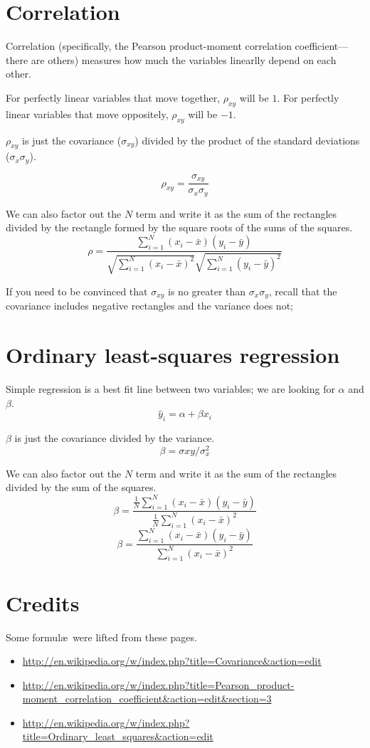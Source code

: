 \documentclass{article}
\begin{document}
\section{Correlation}
Correlation (specifically, the Pearson product-moment correlation coefficient---there are others)
measures how much the variables linearlly depend on each other.

For perfectly linear variables that move together, $\rho_{xy}$ will be $1$.
For perfectly linear variables that move oppositely, $\rho_{xy}$ will be $-1$.

$\rho_{xy}$ is just the covariance ($\sigma_{xy}$) divided by
the product of the standard deviations ($\sigma_x\sigma_y$).

$$ \rho_{xy} = \frac{\sigma_{xy}}{\sigma_x\sigma_y} $$

We can also factor out the $N$ term and write it as the sum of the rectangles divided by
the rectangle formed by the square roots of the sums of the squares.
$$ \rho = \frac
{ \sum_{i=1}^{N}\left( x_{i}-\bar{x} \right) \left( y_{i}-\bar{y} \right) }
{
  \sqrt{\sum_{i=1}^{N}\left( x_{i}-\bar{x} \right)^2}
  \sqrt{\sum_{i=1}^{N}\left( y_{i}-\bar{y} \right)^2}
}
$$

If you need to be convinced that $\sigma_{xy}$ is no greater than $\sigma_x\sigma_y$,
recall that the covariance includes negative rectangles and the variance does not;



\section{Ordinary least-squares regression}
Simple regression is a best fit line between two variables; we are looking for $\alpha$ and $\beta$.
$$ \hat{y}_i = \alpha + \beta x_i$$

$\beta$ is just the covariance divided by the variance.
$$ \beta = \sigma{xy}/\sigma_x^2 $$

We can also factor out the $N$ term and write it as the sum of the rectangles divided by the sum of the squares.
$$ \beta = \frac
{\frac{1}{N}\sum_{i=1}^{N}\left( x_{i}-\bar{x} \right) \left( y_{i}-\bar{y} \right)}
{\frac{1}{N}\sum_{i=1}^{N}\left( x_{i}-\bar{x} \right)^2}
$$
$$ \beta = \frac
{\sum_{i=1}^{N}\left( x_{i}-\bar{x} \right) \left( y_{i}-\bar{y} \right)}
{\sum_{i=1}^{N}\left( x_{i}-\bar{x} \right)^2}
$$

\section{Credits}
Some formul\ae\ were lifted from these pages.
\begin{itemize}
\item \url{http://en.wikipedia.org/w/index.php?title=Covariance&action=edit}
\item \url{http://en.wikipedia.org/w/index.php?title=Pearson_product-moment_correlation_coefficient&action=edit&section=3}
\item \url{http://en.wikipedia.org/w/index.php?title=Ordinary_least_squares&action=edit}
\end{itemize}
\end{document}
